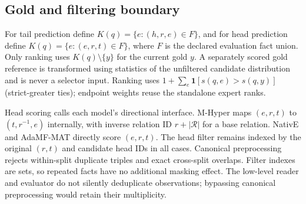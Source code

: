 \documentclass[11pt,a4paper]{article}
\newcommand{\ind}{\mathbf{1}}
\begin{document}
\subsection{Gold and filtering boundary}
\label{app:information-boundary}
For tail prediction define $K(q)=\{e:(h,r,e)\in F\}$, and for head prediction define $K(q)=\{e:(e,r,t)\in F\}$, where $F$ is the declared evaluation fact union. Only ranking uses $K(q)\setminus\{y\}$ for the current gold $y$. A separately scored gold reference is transformed using statistics of the unfiltered candidate distribution and is never a selector input. Ranking uses $1+\sum_e\ind[s(q,e)>s(q,y)]$ (strict-greater ties); endpoint weights reuse the standalone expert ranks.

Head scoring calls each model's directional interface. M-Hyper maps $(e,r,t)$ to $(t,r^{-1},e)$ internally, with inverse relation ID $r+|\mathcal R|$ for a base relation. NativE and AdaMF-MAT directly score $(e,r,t)$. The head filter remains indexed by the original $(r,t)$ and candidate head IDs in all cases. Canonical preprocessing rejects within-split duplicate triples and exact cross-split overlaps. Filter indexes are sets, so repeated facts have no additional masking effect. The low-level reader and evaluator do not silently deduplicate observations; bypassing canonical preprocessing would retain their multiplicity.
\end{document}
